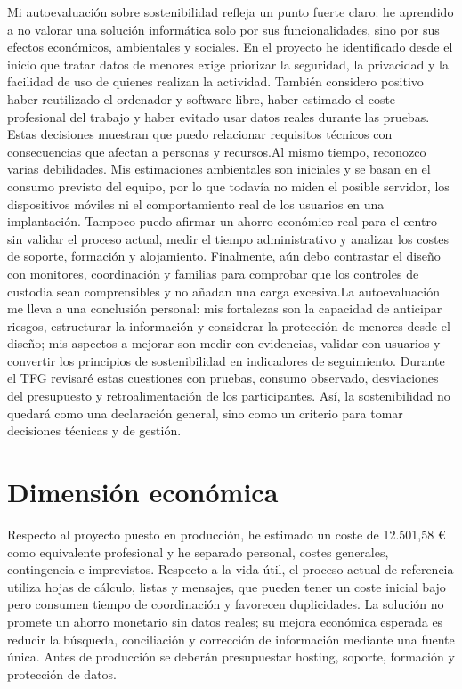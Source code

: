 Mi autoevaluación sobre sostenibilidad refleja un punto fuerte claro: he aprendido a no valorar una solución informática solo por sus funcionalidades, sino por sus efectos económicos, ambientales y sociales. En el proyecto he identificado desde el inicio que tratar datos de menores exige priorizar la seguridad, la privacidad y la facilidad de uso de quienes realizan la actividad. También considero positivo haber reutilizado el ordenador y software libre, haber estimado el coste profesional del trabajo y haber evitado usar datos reales durante las pruebas. Estas decisiones muestran que puedo relacionar requisitos técnicos con consecuencias que afectan a personas y recursos.\newline \newline Al mismo tiempo, reconozco varias debilidades. Mis estimaciones ambientales son iniciales y se basan en el consumo previsto del equipo, por lo que todavía no miden el posible servidor, los dispositivos móviles ni el comportamiento real de los usuarios en una implantación. Tampoco puedo afirmar un ahorro económico real para el centro sin validar el proceso actual, medir el tiempo administrativo y analizar los costes de soporte, formación y alojamiento. Finalmente, aún debo contrastar el diseño con monitores, coordinación y familias para comprobar que los controles de custodia sean comprensibles y no añadan una carga excesiva.\newline \newline La autoevaluación me lleva a una conclusión personal: mis fortalezas son la capacidad de anticipar riesgos, estructurar la información y considerar la protección de menores desde el diseño; mis aspectos a mejorar son medir con evidencias, validar con usuarios y convertir los principios de sostenibilidad en indicadores de seguimiento. Durante el TFG revisaré estas cuestiones con pruebas, consumo observado, desviaciones del presupuesto y retroalimentación de los participantes. Así, la sostenibilidad no quedará como una declaración general, sino como un criterio para tomar decisiones técnicas y de gestión.

\section{Dimensión económica}\label{sec:sost-3}

Respecto al proyecto puesto en producción, he estimado un coste de 12.501,58 € como equivalente profesional y he separado personal, costes generales, contingencia e imprevistos. Respecto a la vida útil, el proceso actual de referencia utiliza hojas de cálculo, listas y mensajes, que pueden tener un coste inicial bajo pero consumen tiempo de coordinación y favorecen duplicidades. La solución no promete un ahorro monetario sin datos reales; su mejora económica esperada es reducir la búsqueda, conciliación y corrección de información mediante una fuente única. Antes de producción se deberán presupuestar hosting, soporte, formación y protección de datos.

